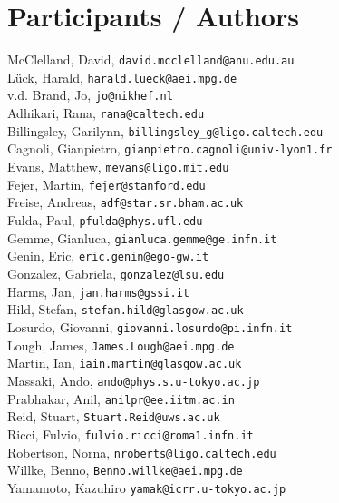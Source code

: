 \chapter{Participants / Authors}
\label{sec:Participants}


McClelland, David, \texttt{david.mcclelland@anu.edu.au}
\\
L\"uck, Harald,   \texttt{harald.lueck@aei.mpg.de} 
\\
v.d. Brand, Jo, \texttt{jo@nikhef.nl} 
\\
Adhikari, Rana, \texttt{rana@caltech.edu}
\\
Billingsley, Garilynn, \texttt{billingsley\_g@ligo.caltech.edu}
\\
Cagnoli, Gianpietro, \texttt{gianpietro.cagnoli@univ-lyon1.fr}
\\
Evans, Matthew, \texttt{mevans@ligo.mit.edu}
\\
Fejer, Martin, \texttt{fejer@stanford.edu}
\\
Freise, Andreas, \texttt{adf@star.sr.bham.ac.uk}
\\
Fulda, Paul, \texttt{pfulda@phys.ufl.edu}
\\
Gemme, Gianluca, \texttt{gianluca.gemme@ge.infn.it}
\\
Genin, Eric, \texttt{eric.genin@ego-gw.it}
\\
Gonzalez, Gabriela, \texttt{gonzalez@lsu.edu}
\\
Harms, Jan, \texttt{jan.harms@gssi.it}
\\
Hild, Stefan, \texttt{stefan.hild@glasgow.ac.uk}
\\
Losurdo, Giovanni, \texttt{giovanni.losurdo@pi.infn.it}
\\
Lough, James, \texttt{James.Lough@aei.mpg.de}
\\
Martin, Ian, \texttt{iain.martin@glasgow.ac.uk}
\\
Massaki, Ando,  \texttt{ando@phys.s.u-tokyo.ac.jp}
\\
Prabhakar, Anil, \texttt{anilpr@ee.iitm.ac.in}
\\
Reid, Stuart, \texttt{Stuart.Reid@uws.ac.uk}
\\
Ricci, Fulvio, \texttt{fulvio.ricci@roma1.infn.it}
\\
Robertson, Norna, \texttt{nroberts@ligo.caltech.edu}
\\
Willke, Benno, \texttt{Benno.willke@aei.mpg.de}
\\
Yamamoto, Kazuhiro \texttt{yamak@icrr.u-tokyo.ac.jp}

